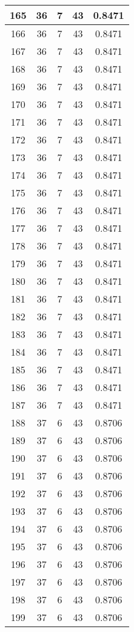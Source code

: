 \documentclass[letterpaper, 12pt]{article}
\begin{document}
\begin{longtable}{|c|c|c|c|c|}
\hline
165 & 36 & 7 & 43 & 0.8471 \\
\hline
166 & 36 & 7 & 43 & 0.8471 \\
\hline
167 & 36 & 7 & 43 & 0.8471 \\
\hline
168 & 36 & 7 & 43 & 0.8471 \\
\hline
169 & 36 & 7 & 43 & 0.8471 \\
\hline
170 & 36 & 7 & 43 & 0.8471 \\
\hline
171 & 36 & 7 & 43 & 0.8471 \\
\hline
172 & 36 & 7 & 43 & 0.8471 \\
\hline
173 & 36 & 7 & 43 & 0.8471 \\
\hline
174 & 36 & 7 & 43 & 0.8471 \\
\hline
175 & 36 & 7 & 43 & 0.8471 \\
\hline
176 & 36 & 7 & 43 & 0.8471 \\
\hline
177 & 36 & 7 & 43 & 0.8471 \\
\hline
178 & 36 & 7 & 43 & 0.8471 \\
\hline
179 & 36 & 7 & 43 & 0.8471 \\
\hline
180 & 36 & 7 & 43 & 0.8471 \\
\hline
181 & 36 & 7 & 43 & 0.8471 \\
\hline
182 & 36 & 7 & 43 & 0.8471 \\
\hline
183 & 36 & 7 & 43 & 0.8471 \\
\hline
184 & 36 & 7 & 43 & 0.8471 \\
\hline
185 & 36 & 7 & 43 & 0.8471 \\
\hline
186 & 36 & 7 & 43 & 0.8471 \\
\hline
187 & 36 & 7 & 43 & 0.8471 \\
\hline
188 & 37 & 6 & 43 & 0.8706 \\
\hline
189 & 37 & 6 & 43 & 0.8706 \\
\hline
190 & 37 & 6 & 43 & 0.8706 \\
\hline
191 & 37 & 6 & 43 & 0.8706 \\
\hline
192 & 37 & 6 & 43 & 0.8706 \\
\hline
193 & 37 & 6 & 43 & 0.8706 \\
\hline
194 & 37 & 6 & 43 & 0.8706 \\
\hline
195 & 37 & 6 & 43 & 0.8706 \\
\hline
196 & 37 & 6 & 43 & 0.8706 \\
\hline
197 & 37 & 6 & 43 & 0.8706 \\
\hline
198 & 37 & 6 & 43 & 0.8706 \\
\hline
199 & 37 & 6 & 43 & 0.8706 \\
\hline
\end{longtable}
\end{document}
